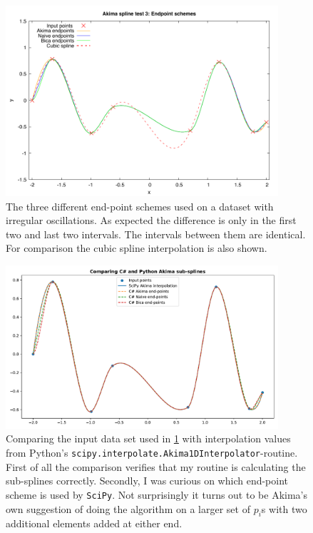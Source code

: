 \documentclass[a4paper]{article}
\begin{document}
\begin{figure}
    \label{fig:4}
    \centering
    \includegraphics[width=0.9\textwidth]{fig/akima_spline_endpoints.pdf}
    \caption{The three different end-point schemes used on a dataset with irregular oscillations. As expected the difference is only in the first two and last two intervals. The intervals between them are identical. For comparison the cubic spline interpolation is also shown. }
\end{figure}

\begin{figure}
    \label{fig:5}
    \centering
    \includegraphics[width=0.9\textwidth]{fig/scipy_comparison.pdf}
    \caption{Comparing the input data set used in \ref{fig:4} with interpolation values from Python's \texttt{scipy.interpolate.Akima1DInterpolator}-routine. First of all the comparison verifies that my routine is calculating the sub-splines correctly. Secondly, I was curious on which end-point scheme is used by \texttt{SciPy}. Not surprisingly it turns out to be Akima's own suggestion of doing the algorithm on a larger set of $p_i$s with two additional elements added at either end.}
\end{figure}
\end{document}
